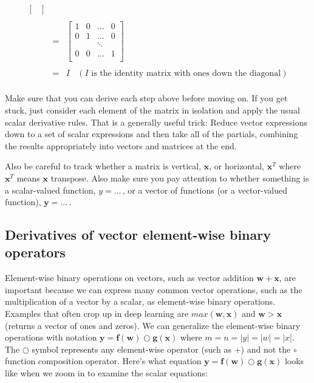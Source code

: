 \documentclass[11pt]{article}
\begin{document}
\begin{eqnarray*}
\begin{bmatrix}
\end{bmatrix}\\\\
 & = & \begin{bmatrix}
1 & 0 & \ldots& 0 \\
0 &1 &\ldots & 0 \\
& & \ddots\\
0 & 0 & \ldots &1 \\
\end{bmatrix}\\\\
& = & I ~~~~(I \text{ is the identity matrix with ones down the diagonal})\\
\end{eqnarray*}


Make sure that you can derive each step above before moving on. If you get stuck, just consider each element of the matrix in isolation and apply the usual scalar derivative rules.   That is a generally useful trick: Reduce vector expressions down to a set of scalar expressions and then take all of the partials, combining the results appropriately into vectors and matrices at the end.
 
Also be careful to track whether a matrix is vertical, $\mathbf{x}$, or horizontal, $\mathbf{x}^T$ where $\mathbf{x}^T$ means $\mathbf{x}$ transpose. Also make sure you pay attention to whether something is a scalar-valued function, $y = ...\,$, or a vector of functions (or a vector-valued function), $\mathbf{y} = ...\,$.



\subsection{Derivatives of vector element-wise binary operators}

Element-wise binary operations on vectors, such as vector addition $\mathbf{w} + \mathbf{x}$, are important because we can express many common vector operations, such as the multiplication of a vector by a scalar, as element-wise binary operations.   Examples that often crop up in deep learning are $max(\mathbf{w},\mathbf{x})$ and $\mathbf{w} > \mathbf{x}$ (returns a vector of ones and zeros). We can generalize the element-wise binary operations with notation $\mathbf{y} = \mathbf{f(w)} \bigcirc \mathbf{g(x)}$ where $m=n=|y|=|w|=|x|$. The $\bigcirc$ symbol represents any element-wise operator (such as $+$) and not the $\circ$ function composition operator.  Here's what equation $\mathbf{y} = \mathbf{f(w)} \bigcirc \mathbf{g(x)}$ looks like when we zoom in to examine the scalar equations:
\end{document}
